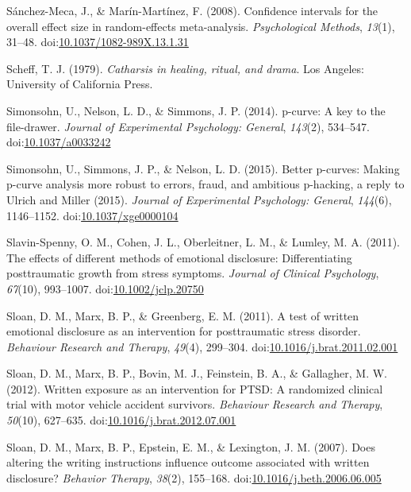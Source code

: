 \documentclass[man]{apa6}
\theoremstyle{definition}
\theoremstyle{definition}
\theoremstyle{definition}
\theoremstyle{remark}
\begin{document}
\hypertarget{ref-Sanchez-Meca2008a}{}
Sánchez-Meca, J., \& Marín-Martínez, F. (2008). Confidence intervals for
the overall effect size in random-effects meta-analysis.
\emph{Psychological Methods}, \emph{13}(1), 31--48.
doi:\href{https://doi.org/10.1037/1082-989X.13.1.31}{10.1037/1082-989X.13.1.31}

\hypertarget{ref-Scheff1979}{}
Scheff, T. J. (1979). \emph{Catharsis in healing, ritual, and drama}.
Los Angeles: University of California Press.

\hypertarget{ref-Simonsohn2014}{}
Simonsohn, U., Nelson, L. D., \& Simmons, J. P. (2014). p-curve: A key
to the file-drawer. \emph{Journal of Experimental Psychology: General},
\emph{143}(2), 534--547.
doi:\href{https://doi.org/10.1037/a0033242}{10.1037/a0033242}

\hypertarget{ref-Simonsohn2015}{}
Simonsohn, U., Simmons, J. P., \& Nelson, L. D. (2015). Better p-curves:
Making p-curve analysis more robust to errors, fraud, and ambitious
p-hacking, a reply to Ulrich and Miller (2015). \emph{Journal of
Experimental Psychology: General}, \emph{144}(6), 1146--1152.
doi:\href{https://doi.org/10.1037/xge0000104}{10.1037/xge0000104}

\hypertarget{ref-Slavin-Spenny2011}{}
Slavin-Spenny, O. M., Cohen, J. L., Oberleitner, L. M., \& Lumley, M. A.
(2011). The effects of different methods of emotional disclosure:
Differentiating posttraumatic growth from stress symptoms. \emph{Journal
of Clinical Psychology}, \emph{67}(10), 993--1007.
doi:\href{https://doi.org/10.1002/jclp.20750}{10.1002/jclp.20750}

\hypertarget{ref-Sloan2011a}{}
Sloan, D. M., Marx, B. P., \& Greenberg, E. M. (2011). A test of written
emotional disclosure as an intervention for posttraumatic stress
disorder. \emph{Behaviour Research and Therapy}, \emph{49}(4), 299--304.
doi:\href{https://doi.org/10.1016/j.brat.2011.02.001}{10.1016/j.brat.2011.02.001}

\hypertarget{ref-Sloan2012}{}
Sloan, D. M., Marx, B. P., Bovin, M. J., Feinstein, B. A., \& Gallagher,
M. W. (2012). Written exposure as an intervention for PTSD: A randomized
clinical trial with motor vehicle accident survivors. \emph{Behaviour
Research and Therapy}, \emph{50}(10), 627--635.
doi:\href{https://doi.org/10.1016/j.brat.2012.07.001}{10.1016/j.brat.2012.07.001}

\hypertarget{ref-Sloan2007}{}
Sloan, D. M., Marx, B. P., Epstein, E. M., \& Lexington, J. M. (2007).
Does altering the writing instructions influence outcome associated with
written disclosure? \emph{Behavior Therapy}, \emph{38}(2), 155--168.
doi:\href{https://doi.org/10.1016/j.beth.2006.06.005}{10.1016/j.beth.2006.06.005}
\end{document}
